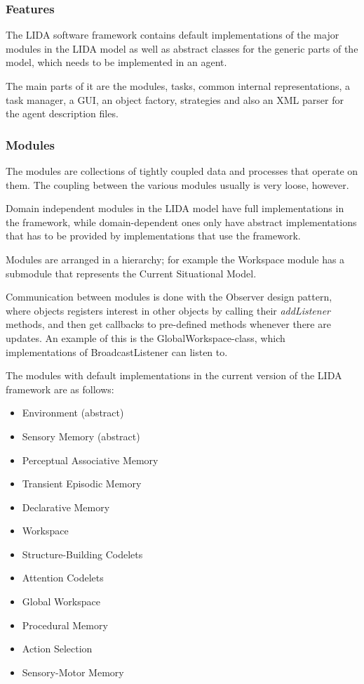 \subsubsection{Features}
The LIDA software framework contains default implementations of the major modules in the LIDA model as well as abstract classes for the generic parts of the model, which needs to be implemented in an agent.

The main parts of it are the modules, tasks, common internal representations, a task manager, a GUI, an object factory, strategies and also an XML parser for the agent description files.\cite{snaider2012lida}

\subsubsection{Modules}
The modules are collections of tightly coupled data and processes that operate on them. The coupling between the various modules usually is very loose, however.

Domain independent modules in the LIDA model have full implementations in the framework, while domain-dependent ones only have abstract implementations that has to be provided by implementations that use the framework.

Modules are arranged in a hierarchy; for example the Workspace module has a submodule that represents the Current Situational Model.

Communication between modules is done with the Observer design pattern, where objects registers interest in other objects by calling their {\em addListener} methods, and then get callbacks to pre-defined methods whenever there are updates. An example of this is the GlobalWorkspace-class, which implementations of BroadcastListener can listen to.

The modules with default implementations in the current version of the LIDA framework are as follows:\cite{snaider2012lida}
\begin{itemize}
 \item Environment (abstract)
 \item Sensory Memory (abstract)
 \item Perceptual Associative Memory
 \item Transient Episodic Memory
 \item Declarative Memory
 \item Workspace
 \item Structure-Building Codelets
 \item Attention Codelets
 \item Global Workspace
 \item Procedural Memory
 \item Action Selection
 \item Sensory-Motor Memory
\end{itemize}

